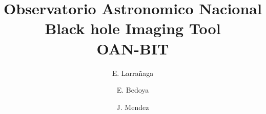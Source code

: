 \documentclass{book}
\begin{document}
\title{ \textbf{O}bservatorio \textbf{A}stronomico \textbf{N}acional \\
\textbf{B}lack hole \textbf{I}maging \textbf{T}ool \\
\textbf{OAN-BIT}}
\author{
	E. Larra\~{n}aga\\
  \and
  E. Bedoya\\
  \and
  J. Mendez\\
}


\maketitle





\end{document}
